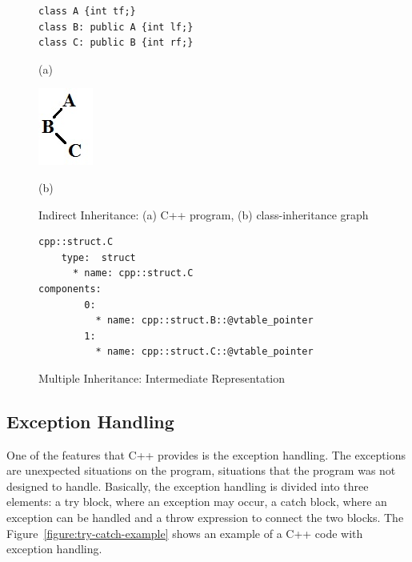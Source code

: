 \documentclass[a4paper]{llncs}
\begin{document}
\begin{figure}[h]

\begin{minipage}[b]{.48\linewidth}
\begin{lstlisting}
class A {int tf;}
class B: public A {int lf;}
class C: public B {int rf;}
\end{lstlisting}
  \centerline{(a)}\medskip
\end{minipage}
\label{figure:indirect-inheritance-code}
%
\begin{minipage}[b]{.48\linewidth}
  \centering
  \centerline{\includegraphics[scale=0.6]{figures/indirect_inheritance}}
  \centerline{(b)}\medskip
\end{minipage}
%
\caption{Indirect Inheritance: (a) C++ program, (b) class-inheritance graph}
\label{fig:indirect-inheritance-graph}
\end{figure}

\begin{figure}[h]
\centering
\begin{minipage}{0.9\textwidth}
\begin{lstlisting}[style=nonumbers]
cpp::struct.C
    type:  struct
      * name: cpp::struct.C
components: 
        0: 
          * name: cpp::struct.B::@vtable_pointer
        1: 
          * name: cpp::struct.C::@vtable_pointer
\end{lstlisting}
\end{minipage}
\caption{Multiple Inheritance: Intermediate Representation}
\label{figure:indirect-inheritance-IR}
\end{figure}

\subsection{Exception Handling}

One of the features that C++ provides is the exception handling. The exceptions are unexpected situations on the program, situations 
that the program was not designed to handle. Basically, the exception handling is divided into three elements: a try block, where an 
exception may occur, a catch block, where an exception can be handled and a throw expression to connect the two blocks. The 
Figure~\ref{figure:try-catch-example} shows an example of a C++ code with exception handling.
\end{document}
